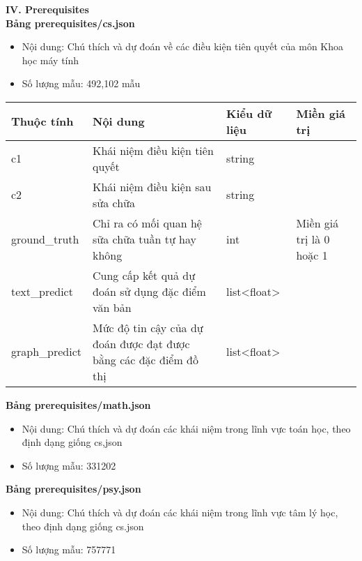 \textbf{IV. Prerequisites}\\
\textbf{Bảng prerequisites/cs.json}\\
\begin{itemize}
    \item Nội dung: Chú thích và dự đoán về các điều kiện tiên quyết của môn Khoa học máy tính
    \item Số lượng mẫu: 492,102 mẫu
\end{itemize}
\begin{center}
\begin{tabular}{|| m{5em}  m{8em}  m{6em}  m{11em}||} 
 \hline
 Thuộc tính & Nội dung & Kiểu dữ liệu & Miền giá trị \\ [0.5ex] 
 \hline\hline
c1 &Khái niệm điều kiện tiên quyết & string &\\
 \hline
c2 & Khái niệm điều kiện sau sửa chữa & string & \\
ground\_truth &Chỉ ra có mối quan hệ sữa chữa tuần tự hay không & int &Miền giá trị là 0 hoặc 1\\
 \hline
text\_predict & Cung cấp kết quả dự đoán sử dụng đặc điểm văn bản & list<float> & \\
 \hline
graph\_predict &Mức độ tin cậy của dự đoán được đạt được bằng các đặc điểm đồ thị  &list<float> &\\ [1ex] 
 \hline
\end{tabular}
\end{center}
%
\textbf{Bảng prerequisites/math.json}\\
\begin{itemize}
    \item Nội dung: Chú thích và dự đoán các khái niệm trong lĩnh vực toán học, theo định dạng giống cs,json
    \item Số lượng mẫu: 331202
\end{itemize}
\textbf{Bảng prerequisites/psy.json}\\
\begin{itemize}
    \item Nội dung: Chú thích và dự đoán các khái niệm trong lĩnh vực tâm lý học, theo định dạng giống cs.json
    \item Số lượng mẫu: 757771
\end{itemize}
